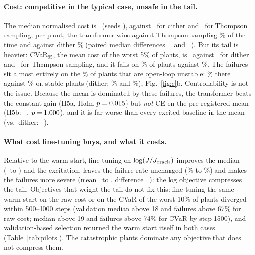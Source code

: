\paragraph{Cost: competitive in the typical case, unsafe in the tail.} The median normalised cost is \CTFmed\ (seeds
\CTFmedRange), against \CCEDmed\ for dither and \CTSmed\ for Thompson sampling; per plant, the transformer wins against
Thompson sampling \CwinsTS\% of the time and against dither \CwinsCED\% (paired median differences \CvsTSmed\ \CvsTSmedci\ and
\CvsCEDmed\ \CvsCEDmedci). But its tail is heavier: CVaR$_{95}$, the mean cost of the worst 5\% of plants, is \CTFcvar\ against \CCEDcvar\ for
dither and \CTScvar\ for Thompson sampling, and it fails on \CTFfail\% of plants against \CCEDfail\%. The failures sit almost
entirely on the \CfracUnst\% of plants that are open-loop unstable: \CfailUnstTF\% there against \CfailStabTF\% on stable
plants (dither: \CfailUnstCED\% and \CfailStabCED\%), Fig.~\ref{fig:c}b. Controllability is not the issue. Because the
mean is dominated by these failures, the transformer beats the constant gain (H5a, Holm $p=0.015$) but \emph{not} CE on
the pre-registered mean (H5b: \Hfiveb\ \Hfivebci, $p=1.000$), and it is far worse than every excited baseline in the mean
(vs.\ dither: \CvsCED\ \CvsCEDci).

\paragraph{What cost fine-tuning buys, and what it costs.} Relative to the warm start, fine-tuning on
$\log(J/J_{\rm oracle})$ improves the median (\CBCmed\ to \CTFmed) and the excitation, leaves the failure rate
unchanged (\CBCfail\% to \CTFfail\%) and makes the failures more severe (mean \CBCmean\ to \CTFmean, difference
\CbcMinusFt\ \CbcMinusFtci): the log objective compresses the tail. Objectives that weight the tail do not fix this: fine-tuning the same warm
start on the raw cost or on the CVaR of the worst 10\% of plants diverged within 500--1000 steps (validation median
above 18 and failures above 67\% for raw cost; median above 19 and failures above 74\% for CVaR by step 1500), and
validation-based selection returned the warm start itself in both cases (Table~\ref{tab:pilots}). The catastrophic plants dominate any objective that does not compress them.

